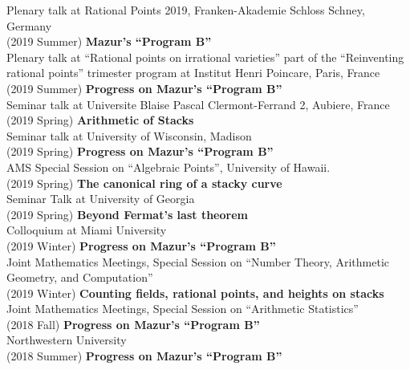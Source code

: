 \documentclass[margin,line]{res}
\begin{document}
\begin{resume}
Plenary talk at Rational Points 2019, Franken-Akademie Schloss Schney, Germany
\vspace{.05cm}\\
(2019 Summer) \textbf{Mazur's ``Program B''}\\  
Plenary talk at ``Rational points on irrational varieties'' part of the  ``Reinventing rational points'' trimester program at Institut Henri Poincare, Paris, France
\\
(2019 Summer) \textbf{Progress on Mazur's ``Program B''}\\  
Seminar talk at Universite Blaise Pascal Clermont-Ferrand 2, Aubiere, France
\vspace{.05cm}\\
(2019 Spring) \textbf{Arithmetic of Stacks}\\  
Seminar talk at  University of Wisconsin, Madison
\vspace{.05cm}\\
(2019 Spring) \textbf{Progress on Mazur's ``Program B''}\\  
AMS Special Session on ``Algebraic Points'', University of Hawaii.
\vspace{.05cm}\\
(2019 Spring) \textbf{The canonical ring of a stacky curve}\\  
Seminar Talk at University of Georgia
\vspace{.05cm}\\
(2019 Spring) \textbf{Beyond Fermat's last theorem}\\
Colloquium at Miami University 
\vspace{.05cm}\\
(2019 Winter) \textbf{Progress on Mazur's ``Program B''}\\  
Joint Mathematics Meetings, Special Session on ``Number Theory, Arithmetic Geometry, and Computation''
\vspace{.05cm}\\
(2019 Winter) \textbf{Counting fields, rational points, and heights on stacks}\\
Joint Mathematics Meetings, Special Session on ``Arithmetic Statistics''
\vspace{.05cm}\\
(2018 Fall) \textbf{Progress on Mazur's ``Program B''}\\  
Northwestern University
\vspace{.05cm}\\
(2018 Summer) \textbf{Progress on Mazur's ``Program B''}\\  

\end{resume}
\end{document}
